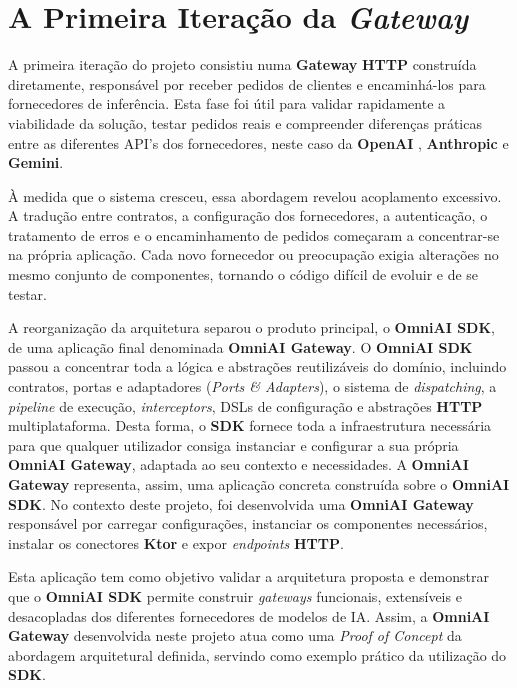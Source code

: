     \section{A Primeira Iteração da \textit{\textbf{Gateway}}}

    A primeira iteração do projeto consistiu numa \textbf{Gateway} \textbf{HTTP} construída diretamente, responsável por receber pedidos de clientes e encaminhá-los para fornecedores de inferência. Esta fase foi útil para validar rapidamente a viabilidade da solução, testar pedidos reais e compreender diferenças práticas entre as diferentes API's dos fornecedores, neste caso da \textbf{OpenAI} \cite{openai_api}, \textbf{Anthropic}\cite{anthropic_api} e \textbf{Gemini}\cite{google_gemini_api}.

    À medida que o sistema cresceu, essa abordagem revelou acoplamento excessivo. A tradução entre contratos, a configuração dos fornecedores, a autenticação, o tratamento de erros e o encaminhamento de pedidos começaram a concentrar-se na própria aplicação. Cada novo fornecedor ou preocupação exigia alterações no mesmo conjunto de componentes, tornando o código difícil de evoluir e de se testar.

A reorganização da arquitetura separou o produto principal, o \textbf{OmniAI SDK}, de uma aplicação final denominada \textbf{OmniAI Gateway}.
O \textbf{OmniAI SDK} passou a concentrar toda a lógica e abstrações reutilizáveis do domínio, incluindo contratos, portas e adaptadores (\textit{Ports \& Adapters}), o sistema de \textit{dispatching}, a \textit{pipeline} de execução, \textit{interceptors}, DSLs de configuração e abstrações \textbf{HTTP} multiplataforma. Desta forma, o \textbf{SDK} fornece toda a infraestrutura necessária para que qualquer utilizador consiga instanciar e configurar a sua própria \textbf{OmniAI Gateway}, adaptada ao seu contexto e necessidades.
A \textbf{OmniAI Gateway} representa, assim, uma aplicação concreta construída sobre o \textbf{OmniAI SDK}. No contexto deste projeto, foi desenvolvida uma \textbf{OmniAI Gateway} responsável por carregar configurações, instanciar os componentes necessários, instalar os conectores \textbf{Ktor} e expor \textit{endpoints} \textbf{HTTP}.

Esta aplicação tem como objetivo validar a arquitetura proposta e demonstrar que o \textbf{OmniAI SDK} permite construir \textit{gateways} funcionais, extensíveis e desacopladas dos diferentes fornecedores de modelos de IA. Assim, a \textbf{OmniAI Gateway} desenvolvida neste projeto atua como uma \textit{Proof of Concept} da abordagem arquitetural definida, servindo como exemplo prático da utilização do \textbf{SDK}.

